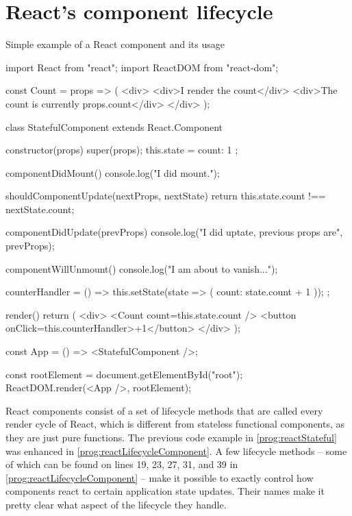 \section{React's component lifecycle}

\begin{program}
\caption{Simple example of a React component and its usage} 
\label{prog:reactLifecycleComponent}
\begin{JsCode}
import React from "react";
import ReactDOM from "react-dom";

const Count = props => (
  <div>
    <div>I render the count</div>
    <div>The count is currently {props.count}</div>
  </div>
);

class StatefulComponent extends React.Component {
  constructor(props) {
    super(props);
    this.state = {
      count: 1
    };
  }

  componentDidMount() {
    console.log("I did mount.");
  }

  shouldComponentUpdate(nextProps, nextState) {
    return this.state.count !== nextState.count;
  }

  componentDidUpdate(prevProps) {
    console.log("I did uptate, previous props are", prevProps);
  }

  componentWillUnmount() {
    console.log("I am about to vanish...");
  }

  counterHandler = () => {
    this.setState(state => ({ count: state.count + 1 }));
  };

  render() {
    return (
      <div>
        <Count count={this.state.count} />
        <button onClick={this.counterHandler}>+1</button>
      </div>
    );
  }
}
  
const App = () => <StatefulComponent />;

const rootElement = document.getElementById("root");
ReactDOM.render(<App />, rootElement);  
\end{JsCode}
\end{program}

React components consist of a set of lifecycle methods that are called every render cycle of React, which is different from stateless functional components, as they are just pure functions. The previous code example in \ref{prog:reactStateful} was enhanced in \ref{prog:reactLifecycleComponent}. A few lifecycle methods -- some of which can be found on lines 19, 23, 27, 31, and 39 in \ref{prog:reactLifecycleComponent} -- make it possible to exactly control how components react to certain application state updates. Their names make it pretty clear what aspect of the lifecycle they handle.

